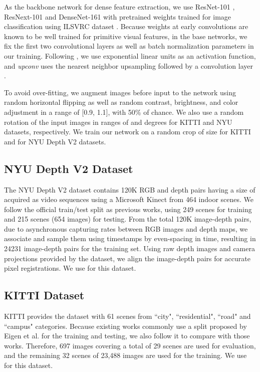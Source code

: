 \documentclass[10pt,twocolumn,letterpaper]{article}
\begin{document}
As the backbone network for dense feature extraction, we use ResNet-101 \cite{he2016deep}, ResNext-101 \cite{xie2017cvpr} and DenseNet-161 \cite{huang2017densely} with pretrained weights trained for image classification using ILSVRC dataset \cite{russakovsky2015imagenet}.
Because weights at early convolutions are known to be well trained for primitive visual features, in the base networks, we fix the first two convolutional layers as well as batch normalization parameters in our training.
Following \cite{godard2017unsupervised}, we use exponential linear units \cite{clevert2015fast} as an activation function, and \textit{upconv} uses the nearest neighbor upsampling followed by a  convolution layer \cite{odena2016deconvolution}.

To avoid over-fitting, we augment images before input to the network using random horizontal flipping as well as random contrast, brightness, and color adjustment in a range of [0.9, 1.1], with 50\% of chance.
We also use a random rotation of the input images in ranges of  and  degrees for KITTI and NYU datasets, respectively.
We train our network on a random crop of size  for KITTI and  for NYU Depth V2 datasets.

\subsection{NYU Depth V2 Dataset}
The NYU Depth V2 dataset \cite{silberman2012indoor} contains 120K RGB and depth pairs having a size of  acquired as video sequences using a Microsoft Kinect from 464 indoor scenes.
We follow the official train/test split as previous works, using 249 scenes for training and 215 scenes (654 images) for testing.
From the total 120K image-depth pairs, due to asynchronous capturing rates between RGB images and depth maps, we associate and sample them using timestamps by even-spacing in time, resulting in 24231 image-depth pairs for the training set.
Using raw depth images and camera projections provided by the dataset, we align the image-depth pairs for accurate pixel registrations.
We use  for this dataset.


\subsection{KITTI Dataset}
KITTI provides the dataset \cite{geiger2013vision} with 61 scenes from ``city", ``residential", ``road" and ``campus" categories.
Because existing works commonly use a split proposed by Eigen et al. \cite{eigen2014depth} for the training and testing, we also follow it to compare with those works.
Therefore, 697 images covering a total of 29 scenes are used for evaluation, and the remaining 32 scenes of 23,488 images are used for the training.
We use  for this dataset.
\end{document}
